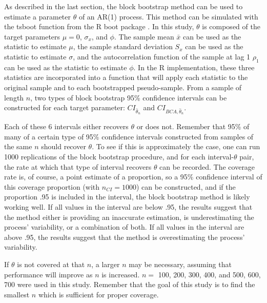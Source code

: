 \documentclass[12pt, letterpaper, titlepage]{article}
\begin{document}
As described in the last section, the block bootstrap method can be used to
estimate a parameter $\theta$ of an AR(1) process. This method can be
simulated with the tsboot function from the R boot package \citep{boot}
\citep{davison}. In this study, $\theta$ is composed of the target parameters
$\mu = 0$, $\sigma_{x}$, and $\phi$. The sample mean $\bar{x}$ can be used as
the statistic to estimate $\mu$, the sample standard deviation $S_x$ can be
used as the statistic to estimate $\sigma$, and the autocorrelation function
of the sample at lag 1 $\rho_1$ can be used as the statistic to estimate
$\phi$. In the R implementation, these three statistics are incorporated into
a function that will apply each statistic to the original sample and to each
bootstrapped pseudo-sample. From a sample of length $n$, two types of block
bootstrap 95\% confidence intervals can be constructed for each target
parameter:
$CI_{\hat{\theta}_{n}}$ and $CI_{BCA, \hat{\theta}_{n}}$.


Each of these 6 intervals either recovers $\theta$ or does not. Remember that
95\% of many of a certain type of 95\% confidence intervals constructed from
samples of the same $n$ should recover $\theta$. To see if this is
approximately the case, one can run 1000 replications of the block bootstrap
procedure, and for each interval-$\theta$ pair, the rate at which that type of
interval recovers $\theta$ can be recorded. The coverage rate is, of course, a
point estimate of a proportion, so a 95\% confidence interval of this coverage
proportion (with $n_{CI} = 1000$) can be constructed, and if the proportion
.95 is included in the interval, the block bootstrap method is likely working
well. If all values in the interval are below .95, the results suggest that the
method either is providing an inaccurate estimation, is underestimating the
process' variability, or a combination of both. If all values in the interval
are above .95, the results suggest that the method is overestimating the
process' variability.


If $\theta$ is not covered at that $n$, a larger $n$ may be
necessary, assuming that performance will improve as $n$ is increased. $n =$
100, 200, 300, 400, and 500, 600, 700 were used in this study. Remember that
the goal of this study is to find the smallest $n$ which is sufficient for
proper coverage. 
\end{document}
